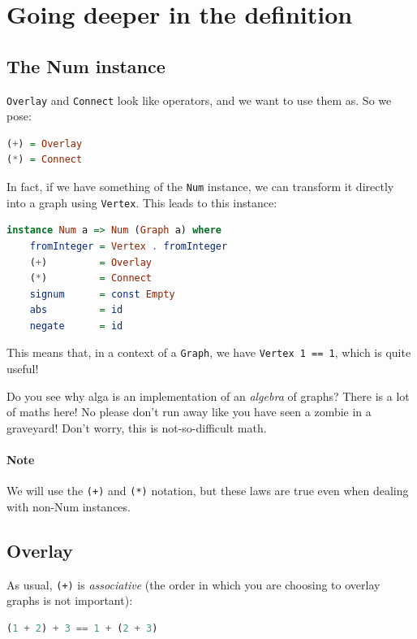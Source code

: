 \documentclass[10pt,a4paper]{article}
\begin{document}
\section{Going deeper in the definition}

\subsection{The Num instance}
\verb|Overlay| and \verb|Connect| look like operators, and we want to use them as. So we pose:

\begin{lstlisting}[language=Haskell, frame=single]
(+) = Overlay
(*) = Connect
\end{lstlisting}

In fact, if we have something of the \verb|Num| instance, we can transform it directly into a graph using \verb|Vertex|. This leads to this instance:

\begin{lstlisting}[language=Haskell, frame=single]
instance Num a => Num (Graph a) where
	fromInteger = Vertex . fromInteger
	(+)         = Overlay
	(*)         = Connect
	signum      = const Empty
	abs         = id
	negate      = id
\end{lstlisting}

This means that, in a context of a \verb|Graph|, we have \verb|Vertex 1 == 1|, which is quite useful!

Do you see why alga is an implementation of an \emph{algebra} of graphs? There is a lot of maths here! No please don't run away like you have seen a zombie in a graveyard!  Don't worry, this is not-so-difficult math.

\paragraph{Note}
We will use the \verb|(+)| and \verb|(*)| notation, but these laws are true even when dealing with non-Num instances.

\subsection{Overlay}

As usual, \verb|(+)| is \emph{associative} (the order in which you are choosing to overlay graphs is not important):
\begin{lstlisting}[language=Haskell, frame=single]
(1 + 2) + 3 == 1 + (2 + 3)
\end{lstlisting}
\end{document}
